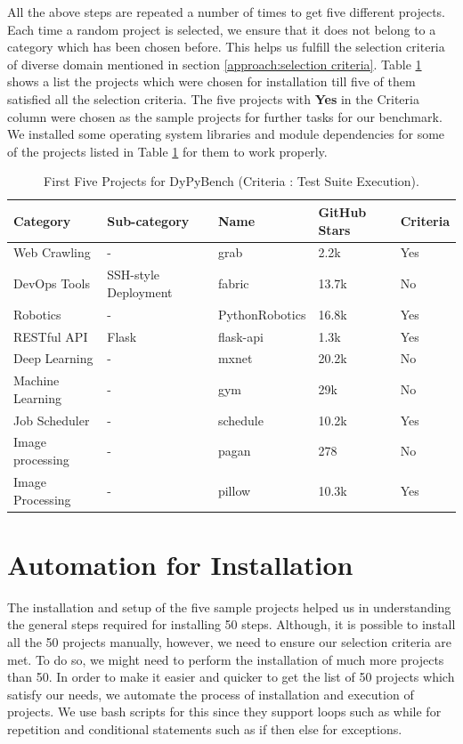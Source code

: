 All the above steps are repeated a number of times to get five different projects.
Each time a random project is selected, we ensure that it does not belong to a category which has been chosen before.
This helps us fulfill the selection criteria of diverse domain mentioned in section \ref{approach:selection criteria}.
Table \ref{table:first_5_projects} shows a list the projects which were chosen for installation till five of them satisfied all the selection criteria.
The five projects with \textbf{Yes} in the Criteria column were chosen as the sample projects for further tasks for our benchmark.
We installed some operating system libraries and module dependencies for some of the projects listed in Table \ref{table:first_5_projects} for them to work properly.  

\begin{table}[ht]
    \centering
    \begin{tabular}{lllll}
    \hline
    \textbf{Category} & \textbf{Sub-category} & \textbf{Name} & \textbf{GitHub Stars} & \textbf{Criteria}\\
    \hline
    Web Crawling & - & grab & 2.2k & Yes\\
    DevOps Tools & SSH-style Deployment & fabric & 13.7k & No\\
    Robotics & - & PythonRobotics & 16.8k & Yes\\
    RESTful API & Flask & flask-api & 1.3k & Yes\\
    Deep Learning & - & mxnet & 20.2k & No\\
    Machine Learning & - & gym & 29k & No\\
    Job Scheduler & - & schedule & 10.2k & Yes\\
    Image processing & - & pagan & 278 & No\\
    Image Processing & - & pillow & 10.3k & Yes\\
    \hline
    \end{tabular}
    \caption{First Five Projects for DyPyBench (Criteria : Test Suite Execution).}
    \label{table:first_5_projects}
\end{table}

\section{Automation for Installation}
\label{impl:Automation for Installation}
The installation and setup of the five sample projects helped us in understanding the general steps required for installing 50 steps.
Although, it is possible to install all the 50 projects manually, however, we need to ensure our selection criteria are met.
To do so, we might need to perform the installation of much more projects than 50.
In order to make it easier and quicker to get the list of 50 projects which satisfy our needs, we automate the process of installation and execution of projects.
We use bash scripts for this since they support loops such as while for repetition and conditional statements such as if then else for exceptions.

